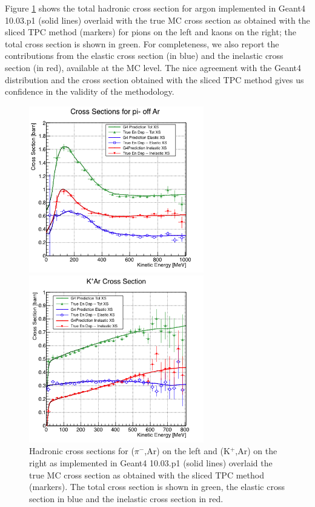Figure \ref{fig:TrueMCXS2} shows the total hadronic cross section for argon implemented in Geant4 10.03.p1 (solid lines) overlaid with the true MC cross section as obtained with the sliced TPC method (markers) for pions on the left and kaons on the right; the total cross section is shown in green. For completeness, we also report the contributions from  the elastic cross section (in blue) and the inelastic cross section (in red), available at the MC level.  The nice agreement with the Geant4 distribution and the cross section  obtained with the sliced TPC method gives us confidence in the  validity of the methodology. 
        
\begin{figure}
\begin{minipage}[b]{.53\textwidth}  
  \centering  
\includegraphics[width=3in]{Chapter-4/Images/PionTrueXS.png}
\end{minipage}%
\begin{minipage}[b]{0.53\textwidth}  
  \centering  
\includegraphics[width=3in]{Chapter-4/Images/KaonTrueXS.png}
\end{minipage}
\caption{Hadronic cross sections for ($\pi^-$,Ar) on the left and (K$^+$,Ar) on the right as implemented in Geant4 10.03.p1 (solid lines) overlaid the true MC cross section as obtained with the sliced TPC method (markers). The total cross section is shown in green,  the elastic cross section in blue and the inelastic cross section in red.}
\label{fig:TrueMCXS2}
\end{figure}






